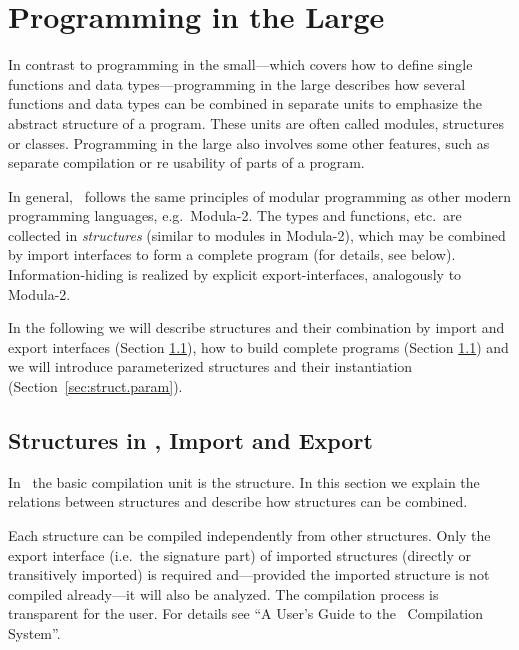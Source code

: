 \chapter{Programming in the Large}
\label{chap:large}
\novice
In contrast to programming in the small---which covers how to define
single functions and data types---programming in the large describes
how several functions and data types can be combined in separate units to
emphasize the abstract structure of a program.
These units are often called modules, structures or classes.
Programming in the large also involves some other features, such as separate
compilation or re usability of parts of a program.

In general, \opal\ follows the same principles of modular programming
as other modern programming languages, e.g.~Modula-2.
The types and functions, etc.~are collected in {\em structures\/}
(similar to modules in Modula-2), which may be combined by 
import interfaces to form a complete program (for details, see below). 
Information-hiding is realized by explicit export-interfaces,
analogously to Modula-2.

In the following we will describe structures and their combination by
import and export interfaces (Section \ref{sec:struct}), how to build
complete programs (Section \ref{sec:struct}) and we will
introduce parameterized structures and their instantiation
(Section~\ref{sec:struct.param}).

\section{Structures in \opal, Import and Export}
\label{sec:struct}
\novice
In \opal\ the basic compilation unit is the structure.
In this section we explain the relations between structures and
describe how structures can be combined.
\medskip

Each structure can be compiled independently from other structures.
Only the export interface (i.e.~the signature part) of imported
structures (directly or transitively imported) is required
and---provided the imported structure is not compiled already---it will
also be analyzed.
The compilation process is transparent for the user.
For details see ``A User's Guide to the \opal\ Compilation System''\cite{Ma}.

